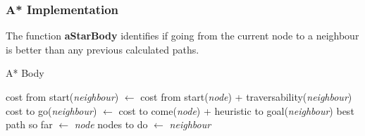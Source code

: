 \documentclass[Space3_Assign3.tex]{subfile}
\begin{document}
\subsubsection{A* Implementation}
The function \textbf{aStarBody} identifies if going from the current node to a neighbour is better than any previous calculated paths.


\begin{algorithm}
\caption{A* Body} \label{PC:A*}
\begin{algorithmic}
\State cost from start(\textit{neighbour}) $\gets$ cost from start(\textit{node}) +  traversability(\textit{neighbour})
\State cost to go(\textit{neighbour}) $\gets$ cost to come(\textit{node}) + heuristic to goal(\textit{neighbour})
\State best path so far $\gets$ \textit{node} 
\EndIf
\State nodes to do $\gets$ \textit{neighbour}
\EndFor
\end{algorithmic}
\end{algorithm}
\end{document}
